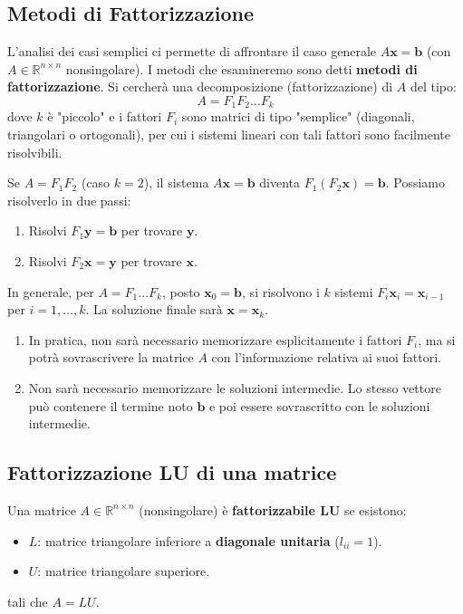 \subsection{Metodi di Fattorizzazione}
L'analisi dei casi semplici ci permette di affrontare il caso generale $A\mathbf{x} = \mathbf{b}$ (con $A \in \mathbb{R}^{n \times n}$ nonsingolare). I metodi che esamineremo sono detti \textbf{metodi di fattorizzazione}.
Si cercherà una decomposizione (fattorizzazione) di $A$ del tipo:
$$ A = F_1 F_2 \dots F_k $$
dove $k$ è "piccolo" e i fattori $F_i$ sono matrici di tipo "semplice" (diagonali, triangolari o ortogonali), per cui i sistemi lineari con tali fattori sono facilmente risolvibili.

Se $A = F_1 F_2$ (caso $k=2$), il sistema $A\mathbf{x} = \mathbf{b}$ diventa $F_1(F_2 \mathbf{x}) = \mathbf{b}$.
Possiamo risolverlo in due passi:
\begin{enumerate}
    \item Risolvi $F_1 \mathbf{y} = \mathbf{b}$ per trovare $\mathbf{y}$.
    \item Risolvi $F_2 \mathbf{x} = \mathbf{y}$ per trovare $\mathbf{x}$.
\end{enumerate}
In generale, per $A = F_1 \dots F_k$, posto $\mathbf{x}_0 = \mathbf{b}$, si risolvono i $k$ sistemi $F_i \mathbf{x}_i = \mathbf{x}_{i-1}$ per $i=1, \dots, k$. La soluzione finale sarà $\mathbf{x} = \mathbf{x}_k$.

\begin{osservazione}[Implementazione]
\begin{enumerate}
    \item In pratica, non sarà necessario memorizzare esplicitamente i fattori $F_i$, ma si potrà sovrascrivere la matrice $A$ con l'informazione relativa ai suoi fattori.
    \item Non sarà necessario memorizzare le soluzioni intermedie. Lo stesso vettore può contenere il termine noto $\mathbf{b}$ e poi essere sovrascritto con le soluzioni intermedie.
\end{enumerate}
\end{osservazione}

\subsection{Fattorizzazione LU di una matrice}
\begin{definition}
Una matrice $A \in \mathbb{R}^{n \times n}$ (nonsingolare) è \textbf{fattorizzabile LU} se esistono:
\begin{itemize}
    \item $L$: matrice triangolare inferiore a \textbf{diagonale unitaria} ($l_{ii}=1$).
    \item $U$: matrice triangolare superiore.
\end{itemize}
tali che $A = L U$.
\end{definition}

